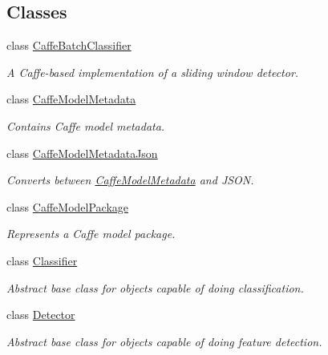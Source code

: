 \subsection*{Classes}
\begin{DoxyCompactItemize}
\item 
class \hyperlink{classdg_1_1deepcore_1_1classification_1_1_caffe_batch_classifier}{Caffe\+Batch\+Classifier}
\begin{DoxyCompactList}\small\item\em A Caffe-\/based implementation of a sliding window detector. \end{DoxyCompactList}\item 
class \hyperlink{structdg_1_1deepcore_1_1classification_1_1_caffe_model_metadata}{Caffe\+Model\+Metadata}
\begin{DoxyCompactList}\small\item\em Contains Caffe model metadata. \end{DoxyCompactList}\item 
class \hyperlink{classdg_1_1deepcore_1_1classification_1_1_caffe_model_metadata_json}{Caffe\+Model\+Metadata\+Json}
\begin{DoxyCompactList}\small\item\em Converts between \hyperlink{structdg_1_1deepcore_1_1classification_1_1_caffe_model_metadata}{Caffe\+Model\+Metadata} and J\+S\+ON. \end{DoxyCompactList}\item 
class \hyperlink{classdg_1_1deepcore_1_1classification_1_1_caffe_model_package}{Caffe\+Model\+Package}
\begin{DoxyCompactList}\small\item\em Represents a Caffe model package. \end{DoxyCompactList}\item 
class \hyperlink{classdg_1_1deepcore_1_1classification_1_1_classifier}{Classifier}
\begin{DoxyCompactList}\small\item\em Abstract base class for objects capable of doing classification. \end{DoxyCompactList}\item 
class \hyperlink{classdg_1_1deepcore_1_1classification_1_1_detector}{Detector}
\begin{DoxyCompactList}\small\item\em Abstract base class for objects capable of doing feature detection. \end{DoxyCompactList}\item 

\end{DoxyCompactItemize}

